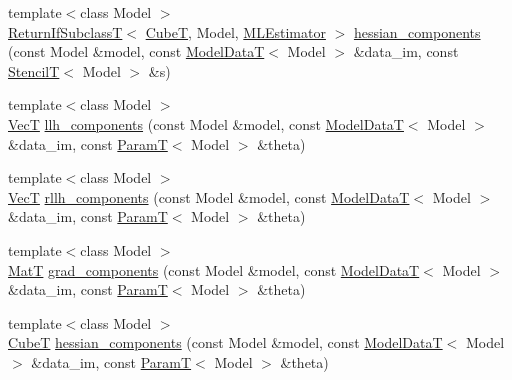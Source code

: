 \begin{DoxyCompactItemize}
\item 
{\footnotesize template$<$class Model $>$ }\\\hyperlink{namespacemappel_a3b77d227658ba3ba9e16fea6fa6e626d}{Return\+If\+SubclassT}$<$ \hyperlink{namespacemappel_ab2afab4e6c8805e83946670d882768c2}{CubeT}, Model, \hyperlink{classmappel_1_1MLEstimator}{M\+L\+Estimator} $>$ \hyperlink{namespacemappel_1_1methods_1_1objective_1_1debug_af8701356bd2b54d5e4c915e443cf95a4}{hessian\+\_\+components} (const Model \&model, const \hyperlink{namespacemappel_a97f050df953605381ae9c901c3b125f1}{Model\+DataT}$<$ Model $>$ \&data\+\_\+im, const \hyperlink{namespacemappel_a3a06598240007876f8c4bf834ad86197}{StencilT}$<$ Model $>$ \&s)
\item 
{\footnotesize template$<$class Model $>$ }\\\hyperlink{namespacemappel_a2225ad69f358daa3f4f99282a35b9a3a}{VecT} \hyperlink{namespacemappel_1_1methods_1_1objective_1_1debug_abc521079f38755daeb93a34e52b144f7}{llh\+\_\+components} (const Model \&model, const \hyperlink{namespacemappel_a97f050df953605381ae9c901c3b125f1}{Model\+DataT}$<$ Model $>$ \&data\+\_\+im, const \hyperlink{namespacemappel_a667925cb0d6c0e49f2f035cc5a9a6857}{ParamT}$<$ Model $>$ \&theta)
\item 
{\footnotesize template$<$class Model $>$ }\\\hyperlink{namespacemappel_a2225ad69f358daa3f4f99282a35b9a3a}{VecT} \hyperlink{namespacemappel_1_1methods_1_1objective_1_1debug_acb5c86698fe86eb0cdec7d3c2282cbb2}{rllh\+\_\+components} (const Model \&model, const \hyperlink{namespacemappel_a97f050df953605381ae9c901c3b125f1}{Model\+DataT}$<$ Model $>$ \&data\+\_\+im, const \hyperlink{namespacemappel_a667925cb0d6c0e49f2f035cc5a9a6857}{ParamT}$<$ Model $>$ \&theta)
\item 
{\footnotesize template$<$class Model $>$ }\\\hyperlink{namespacemappel_a7091ab87c528041f7e2027195fad8915}{MatT} \hyperlink{namespacemappel_1_1methods_1_1objective_1_1debug_a248846fd4bd29d11cac981a3a8b3bdd4}{grad\+\_\+components} (const Model \&model, const \hyperlink{namespacemappel_a97f050df953605381ae9c901c3b125f1}{Model\+DataT}$<$ Model $>$ \&data\+\_\+im, const \hyperlink{namespacemappel_a667925cb0d6c0e49f2f035cc5a9a6857}{ParamT}$<$ Model $>$ \&theta)
\item 
{\footnotesize template$<$class Model $>$ }\\\hyperlink{namespacemappel_ab2afab4e6c8805e83946670d882768c2}{CubeT} \hyperlink{namespacemappel_1_1methods_1_1objective_1_1debug_a70fff3cc898fe86da323c773dba30ab2}{hessian\+\_\+components} (const Model \&model, const \hyperlink{namespacemappel_a97f050df953605381ae9c901c3b125f1}{Model\+DataT}$<$ Model $>$ \&data\+\_\+im, const \hyperlink{namespacemappel_a667925cb0d6c0e49f2f035cc5a9a6857}{ParamT}$<$ Model $>$ \&theta)
\end{DoxyCompactItemize}


